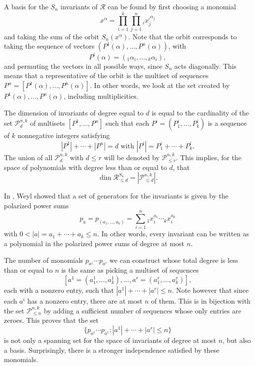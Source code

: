 \documentclass[12pt]{article}%
\begin{document}
A basis for the $S_{n}$ invariants of $\mathcal{R}$ can be found by first
choosing a monomial
\[
x^{\alpha}= \prod_{i=1}^{k} \prod_{j=1}^{n} {}_{i}x_{j}^{ {}_{i}\alpha_{j}}%
\]
and taking the sum of the orbit $S_{n}(x^{\alpha})$. Note that the orbit
corresponds to taking the sequence of vectors $(P^{1}(\alpha) ,\dots,
P^{n}(\alpha))$, with
\[
P^{i}(\alpha) = ({}_{1}\alpha_{i},\dots, {}_{k}\alpha_{i}),
\]
and permuting the vectors in all possible ways, since $S_{n}$ acts diagonally.
This means that a representative of the orbit is the multiset of sequences
$P^{\alpha}= [P^{1}(\alpha) ,\dots, P^{n}(\alpha)].$ In other words, we look
at the set created by $P^{1}(\alpha) ,\dots, P^{n}(\alpha)$, including multiplicities.

The dimension of invariants of degree equal to $d$ is equal to the cardinality
of the set $\mathcal{P}_{d}^{n,k}$ of multisets $[P^{1},\dots,P^{n}]$ such
that each $P^{i}=(P_{1}^{i},\dots,P_{k}^{i})$ is a sequence of $k$ nonnegative
integers satisfying
\[
|P^{1}|+\cdots+|P^{n}|=d\text{ with }|P^{i}|=P_{1}^{i}+\cdots+P_{k}^{i}.
\]
The union of all $\mathcal{P}_{d}^{n,k}$ with $d\leq r$ will be denoted by
$\mathcal{P}_{\leq r}^{n,k}$. This implies, for the space of polynomials with
degree less than or equal to $d$, that
\[
\dim\mathcal{R}_{\leq d}^{S_{n}}=|\mathcal{P}_{\leq d}^{n,k}|.
\]


In \cite{Weyl}, Weyl showed that a set of generators for the invariants is
given by the polarized power sums
\[
p_{a}=p_{(a_{1},\dots,a_{k})}=\sum_{i=1}^{n}{}_{1}x_{i}^{a_{1}}\cdots{}%
_{k}x_{i}^{a_{k}}%
\]
with $0<|a|=a_{1}+\cdots+a_{k}\leq n$. In other words, every invariant can be
written as a polynomial in the polarized power sums of degree at most $n$.

The number of monomials $p_{a^{1}}\cdots p_{a^{r}}$ we can construct whose
total degree is less than or equal to $n$ is the same as picking a multiset of
sequences
\[
\left[  a^{1}=(a_{1}^{1},\dots,a_{k}^{1}),\dots,a^{r}=(a_{1}^{r},\dots
,a_{k}^{r})\right]  ,
\]
each with a nonzero entry, such that $|a^{1}|+\cdots+|a^{r}|\leq n$. Note
however that since each $a^{i}$ has a nonzero entry, there are at most $n$ of
them. This is in bijection with the set $\mathcal{P}_{\leq n}^{n,k}$ by adding
a sufficient number of sequences whose only entries are zeroes. This proves
that the set
\[
\{p_{a^{1}}\cdots p_{a^{r}}:|a^{1}|+\cdots+|a^{r}|\leq n\}
\]
is not only a spanning set for the space of invariants of degree at most $n$,
but also a basis. Surprisingly, there is a stronger independence satisfied by
these monomials.
\end{document}
